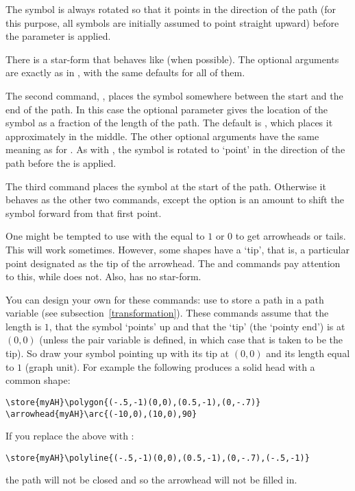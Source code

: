 \documentclass[letterpaper]{article}
\begin{document}
The symbol is always rotated so that it points in the direction of the
path (for this purpose, all symbols are initially assumed to point
straight upward) before the  parameter is applied.

There is a star-form  that behaves like  (when
possible). The optional arguments are exactly as in , with the
same defaults for all of them.

The second command, , places the symbol somewhere between
the start and the end of the path. In this case the optional parameter
 gives the location of the symbol as a fraction
of the length of the path. The default is , which places it
approximately in the middle. The other optional arguments have the same
meaning as for . As with , the symbol is
rotated to `point' in the direction of the path before the
 is applied.

The third command  places the symbol at the start of the
path. Otherwise it behaves as the other two commands, except the option
 is an amount to shift the symbol forward from
that first point.

One might be tempted to use  with the  equal
to $1$ or $0$ to get arrowheads or tails. This will work sometimes.
However, some shapes have a `tip', that is, a particular point
designated as the tip of the arrowhead. The  and
 commands pay attention to this, while  does
not. Also,  has no star-form.

You can design your own  for these commands: use 
to store a path in a path variable (see
subsection~\ref{transformation}). These commands assume that the length
is $1$, that the symbol `points' up and that the `tip' (the `pointy
end') is at $(0,0)$ (unless the pair variable  is
defined, in which case that is taken to be the tip). So draw your symbol
pointing up with its tip at $(0,0)$ and its length equal to $1$ (graph
unit). For example the following produces a solid head with a common
shape:
\begin{verbatim}
\store{myAH}\polygon{(-.5,-1)(0,0),(0.5,-1),(0,-.7)}
\arrowhead{myAH}\arc{(-10,0),(10,0),90}
\end{verbatim}
If you replace the  above with :
\begin{verbatim}
\store{myAH}\polyline{(-.5,-1)(0,0),(0.5,-1),(0,-.7),(-.5,-1)}
\end{verbatim}
the path will not be closed and so the arrowhead will not be filled in.
\end{document}
